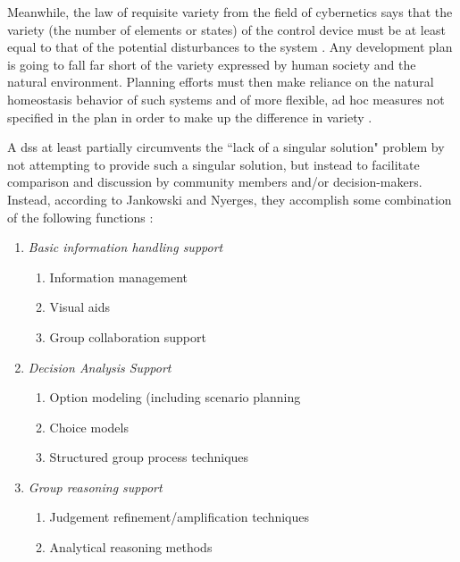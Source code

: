 Meanwhile, the law of requisite variety from the field of cybernetics says that the variety (the number of elements or states) of the control device must be at least equal to that of the potential disturbances to the system \cite{ashbyRequisiteVarietyIts1991}. Any development plan is going to fall far short of the variety expressed by human society and the natural environment. Planning efforts must then make reliance on the natural homeostasis behavior of such systems and of more flexible, ad hoc measures not specified in the plan in order to make up the difference in variety \cite{mcloughlinSystemGuidanceControl1972}. 

A \ac{dss} at least partially circumvents the ``lack of a singular solution" problem by not attempting to provide such a singular solution, but instead to facilitate comparison and discussion by community members and/or decision-makers. Instead, according to Jankowski and Nyerges, they accomplish some combination of the following functions \cite{jankowskiGISGroupDecision2001}: 

\begin{enumerate}[itemsep=0pt,parsep=0pt]
	\item{\textit{Basic information handling support}}
		\begin{enumerate}[itemsep=0pt,parsep=0pt,topsep=0pt, partopsep=0pt]
			\item{Information management}
			\item{Visual aids}
			\item{Group collaboration support}
		\end{enumerate}
	\item{\textit{Decision Analysis Support}}
		\begin{enumerate}[itemsep=0pt,parsep=0pt,topsep=0pt, partopsep=0pt]
			\item{Option modeling (including scenario planning \cite{borjesonScenarioTypesTechniques2006}}
			\item{Choice models}
			\item{Structured group process techniques}
		\end{enumerate}
	\item{\textit{Group reasoning support}}
		\begin{enumerate}[itemsep=0pt,parsep=0pt,topsep=0pt, partopsep=0pt]
			\item{Judgement refinement/amplification techniques}
			\item{Analytical reasoning methods}
		\end{enumerate}
\end{enumerate}

